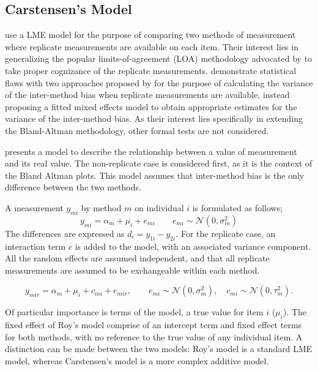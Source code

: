 \documentclass[12pt, a4paper]{article}
\theoremstyle{plain}
\theoremstyle{definition}
\theoremstyle{remark}
\begin{document}
	\newpage
	\subsection{Carstensen's Model}
	
	\citet{BXC2008} use a LME model for the purpose of comparing two methods of measurement where replicate measurements are available on each item. Their interest lies in generalizing the popular limits-of-agreement (LOA) methodology advocated by \citet{BA86} to take proper cognizance of the replicate measurements. \citet{BXC2008} demonstrate statistical flaws with two approaches proposed by \citet{BA99} for the purpose of calculating the variance of the inter-method bias when replicate measurements are available, instead proposing a fitted mixed effects model to obtain appropriate estimates for the variance of the inter-method bias.  As their interest lies specifically in extending the Bland-Altman methodology, other formal tests are not considered.
	
\citet{BXC2004} presents a model to describe the relationship between a value of measurement and its
real value. The non-replicate case is considered first, as it is the context of the Bland Altman plots. This model assumes that inter-method bias is the only difference between the two methods.
	
	A measurement $y_{mi}$ by method $m$ on individual $i$ is formulated as follows;
	\begin{equation}
	y_{mi}  = \alpha_{m} + \mu_{i} + e_{mi} \qquad  e_{mi} \sim
	\mathcal{N}(0,\sigma^{2}_{m})
	\end{equation}
	The differences are expressed as $d_{i} = y_{1i} - y_{2i}$. For the replicate case, an interaction term $c$ is added to the model, with an associated variance component. All the random effects are assumed independent, and that all replicate measurements are assumed to be exchangeable within each method.
	
	\begin{equation}
	y_{mir}  = \alpha_{m} + \mu_{i} + c_{mi} + e_{mir}, \qquad  e_{mi}
	\sim \mathcal{N}(0,\sigma^{2}_{m}), \quad c_{mi} \sim \mathcal{N}(0,\tau^{2}_{m}).
	\end{equation}
	
	Of particular importance is terms of the model, a true value for item $i$ ($\mu_{i}$).  The fixed effect of Roy's model comprise of an intercept term and fixed effect terms for both methods, with no reference to the true value of any individual item. A distinction can be made between the two models: Roy's model is a standard LME model, whereas Carstensen's model is a more complex additive model.
	
\end{document}

